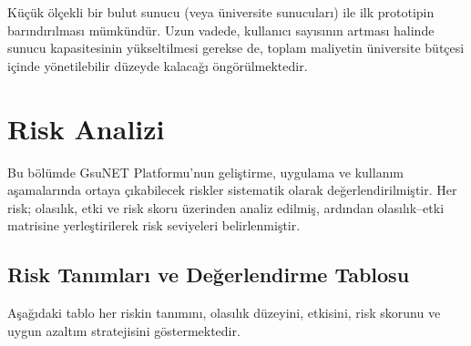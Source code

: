 \documentclass[a4paper,12pt]{report}
\begin{document}
Küçük ölçekli bir bulut sunucu (veya üniversite sunucuları) ile ilk prototipin barındırılması mümkündür. Uzun vadede, kullanıcı sayısının artması halinde sunucu kapasitesinin yükseltilmesi gerekse de, toplam maliyetin üniversite bütçesi içinde yönetilebilir düzeyde kalacağı öngörülmektedir.

\section{Risk Analizi}

Bu bölümde GsuNET Platformu’nun geliştirme, uygulama ve kullanım aşamalarında ortaya çıkabilecek riskler sistematik olarak değerlendirilmiştir. Her risk; olasılık, etki ve risk skoru üzerinden analiz edilmiş, ardından olasılık–etki matrisine yerleştirilerek risk seviyeleri belirlenmiştir.

\subsection{Risk Tanımları ve Değerlendirme Tablosu}

Aşağıdaki tablo her riskin tanımını, olasılık düzeyini, etkisini, risk skorunu ve uygun azaltım stratejisini göstermektedir.
\end{document}
